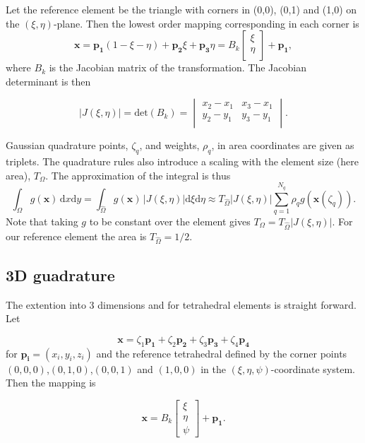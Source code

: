 \documentclass[paper=a4, fontsize=11pt]{scrartcl} %
\begin{document}
Let the reference element be the triangle with corners in (0,0), (0,1) and (1,0) on the $(\xi,\eta)$-plane. Then the lowest order mapping corresponding in each corner is
\[ \mathbf{x}= \mathbf{p_1}(1-\xi-\eta) +\mathbf{p_2}\xi +\mathbf{p_3}\eta = B_k\left[ \begin{array}{c} \xi\\ \eta\\ \end{array} \right] + \mathbf{p_1},
\]
where $B_k$ is the Jacobian matrix of the transformation. The Jacobian determinant is then

\begin{equation}
|J(\xi,\eta)| = \mathrm{det}(B_k) = \begin{vmatrix}
  x_2-x_1 & x_3-x_1 \\
  y_2-y_1 & y_3-y_1 \\
\end{vmatrix}.
  \label{eq:jacobian2d}
\end{equation}

Gaussian quadrature points, $\zeta_q$, and weights, $\rho_q$, in area coordinates are given as triplets. The quadrature rules also introduce a scaling with the element size (here area), $T_\Omega$. The approximation of the integral is thus
\[ \int_{\Omega} \! g(\mathbf{x}) \, \mathrm{d}x\mathrm{d}y = \int_{\hat{\Omega}} \! g(\mathbf{x}) \, |J(\xi,\eta)| \mathrm{d}\xi \mathrm{d}\eta \approx T_{\hat{\Omega}} |J(\xi,\eta)| \sum_{q=1}^{N_q} \rho_{q}g(\mathbf{x}(\zeta_q)).
\]
Note that taking $g$ to be constant over the element gives $T_{\Omega}=T_{\hat{\Omega}} |J(\xi,\eta)|$. For our reference element the area is $T_{\hat{\Omega}}=1/2$.

\subsection{3D guadrature}
The extention into 3 dimensions and for tetrahedral elements is straight forward. Let

\[ \mathbf{x} = \zeta_1\mathbf{p_1} +\zeta_2\mathbf{p_2} +\zeta_3\mathbf{p_3} + \zeta_4\mathbf{p_4} 
\]
for $\mathbf{p_i} =(x_i,y_i,z_i)$ and the reference tetrahedral defined by the corner points $(0,0,0)$,$(0,1,0)$,$(0,0,1)$ and $(1,0,0)$ in the $(\xi,\eta,\psi)$-coordinate system. Then the mapping is

\[ \mathbf{x}= B_k\left[ \begin{array}{c} \xi\\ \eta\\ \psi \end{array} \right] + \mathbf{p_1}.
\]
\end{document}
